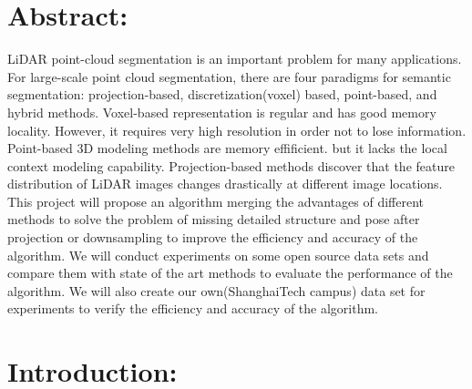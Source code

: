 \documentclass{article}
\begin{document}
    \begin{normalsize}
    
    	\section{Abstract:}
        LiDAR point-cloud segmentation is an important problem for many applications. For large-scale point cloud segmentation, there are four paradigms for semantic segmentation: projection-based, discretization(voxel) based, point-based, and hybrid methods. Voxel-based representation is regular and has good memory locality. However, it requires very high resolution in order not to lose information. Point-based 3D modeling methods are memory effificient. but it lacks the local context modeling capability. Projection-based methods discover that the feature distribution of LiDAR images changes drastically at different image locations. This project will propose an algorithm merging the advantages of different methods to solve the problem of missing detailed structure and pose after projection or downsampling to improve the efficiency and accuracy of the algorithm. We will conduct experiments on some open source data sets and compare them with state of the art methods to evaluate the performance of the algorithm. We will also create our own(ShanghaiTech campus) data set for experiments to verify the efficiency and accuracy of the algorithm.    \\
      
		\section{Introduction:}
        

\end{normalsize}
\end{document}
